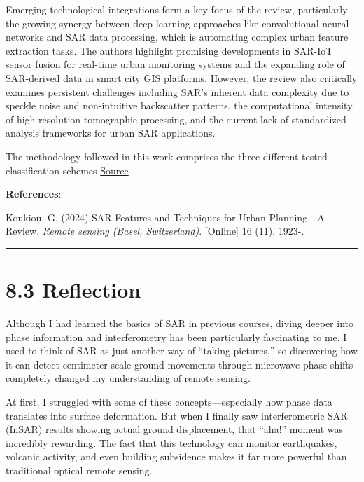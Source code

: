 \documentclass[
  letterpaper,
  DIV=11,
  numbers=noendperiod]{scrreprt}
\begin{document}
Emerging technological integrations form a key focus of the review,
particularly the growing synergy between deep learning approaches like
convolutional neural networks and SAR data processing, which is
automating complex urban feature extraction tasks. The authors highlight
promising developments in SAR-IoT sensor fusion for real-time urban
monitoring systems and the expanding role of SAR-derived data in smart
city GIS platforms. However, the review also critically examines
persistent challenges including SAR's inherent data complexity due to
speckle noise and non-intuitive backscatter patterns, the computational
intensity of high-resolution tomographic processing, and the current
lack of standardized analysis frameworks for urban SAR applications.

The methodology followed in this work comprises the three different
tested classification schemes
\href{https://www.researchgate.net/publication/380914201_SAR_Features_and_Techniques_for_Urban_Planning-A_Review}{Source}

\textbf{References}:

Koukiou, G. (2024) SAR Features and Techniques for Urban Planning---A
Review. \emph{Remote sensing (Basel, Switzerland)}. {[}Online{]} 16
(11), 1923-.

\begin{center}\rule{0.5\linewidth}{0.5pt}\end{center}

\section{8.3 Reflection}\label{reflection-6}

Although I had learned the basics of SAR in previous courses, diving
deeper into phase information and interferometry has been particularly
fascinating to me. I used to think of SAR as just another way of
``taking pictures,'' so discovering how it can detect centimeter-scale
ground movements through microwave phase shifts completely changed my
understanding of remote sensing.

At first, I struggled with some of these concepts---especially how phase
data translates into surface deformation. But when I finally saw
interferometric SAR (InSAR) results showing actual ground displacement,
that ``aha!'' moment was incredibly rewarding. The fact that this
technology can monitor earthquakes, volcanic activity, and even building
subsidence makes it far more powerful than traditional optical remote
sensing.
\end{document}
